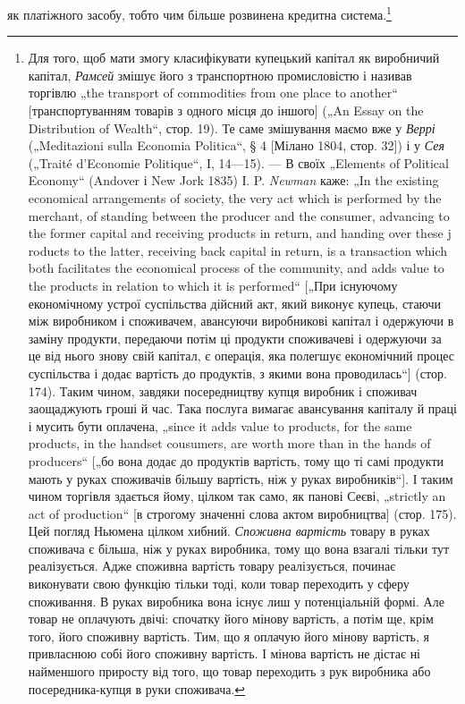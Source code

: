 як платіжного засобу, тобто чим більше розвинена кредитна система.\footnote{
Для того, щоб мати змогу класифікувати купецький капітал як виробничий
капітал, \emph{Рамсей} змішує його з транспортною промисловістю і називав
торгівлю „the transport of commodities from one place to another“ [транспортуванням
товарів з одного місця до іншого] („An Essay on the Distribution of
Wealth“, стор. 19). Те саме змішування маємо вже у \emph{Веррі} („Meditazioni sulla
Economia Politica“, § 4 [Мілано 1804, стор. 32]) і у \emph{Сея} („Traité d’Economie
Politique“, I, 14—15). — В своїх „Elements of Political Economy“ (Andover і
New Jork 1835) І. P. \emph{Newman} каже: „In the existing economical arrangements of
society, the very act which is performed by the merchant, of standing between the
producer and the consumer, advancing to the former capital and receiving products
in return, and handing over these j roducts to the latter, receiving back capital in
return, is a transaction which both facilitates the economical process of the community,
and adds value to the products in relation to which it is performed“ [„При існуючому
економічному устрої суспільства дійсний акт, який виконує купець,
стаючи між виробником і споживачем, авансуючи виробникові капітал і одержуючи
в заміну продукти, передаючи потім ці продукти споживачеві і одержуючи
за це від нього знову свій капітал, є операція, яка полегшує економічний
процес суспільства і додає вартість до продуктів, з якими вона проводилась“]
(стор. 174). Таким чином, завдяки посередництву купця виробник і споживач
заощаджують гроші й час. Така послуга вимагає авансування капіталу й праці
і мусить бути оплачена, „since it adds value to products, for the same products,
in the handset cousumers, are worth more than in the hands of producers“ [„бо вона
додає до продуктів вартість, тому що ті самі продукти мають у руках споживачів
більшу вартість, ніж у руках виробників“]. І таким чином торгівля
здається йому, цілком так само, як панові Сеєві, „strictly an act of production“
[в строгому значенні слова актом виробництва] (стор. 175). Цей погляд Ньюмена
цілком хибний. \emph{Споживна вартість} товару в руках споживача є більша, ніж у
руках виробника, тому що вона взагалі тільки тут реалізується. Адже споживна
вартість товару реалізується, починає виконувати свою функцію тільки тоді,
коли товар переходить у сферу споживання. В руках виробника вона існує лиш
у потенціальній формі. Але товар не оплачують двічі: спочатку його мінову
вартість, а потім ще, крім того, його споживну вартість. Тим, що я оплачую
його мінову вартість, я привласнюю собі його споживну вартість. І мінова вартість
не дістає ні найменшого приросту від того, що товар переходить з рук
виробника або посередника-купця в руки споживача.
}


